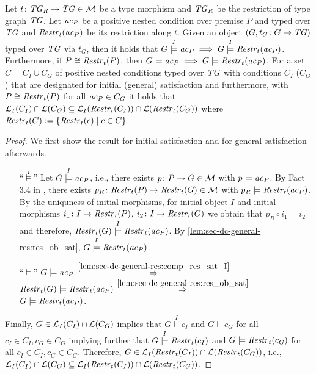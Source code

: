 \begin{proposition}
\label{lem:sec-dc-general-res:comp_res_sat_II}
Let $t\colon \mathit{TG}_R \to \mathit{TG} \in {\cal M}$ be a type morphism and $\mathit{TG}_R$ be the restriction of type graph $\mathit{TG}$.
Let $\mathit{ac}_P$ be a positive nested condition over premise $P$ and typed over $\mathit{TG}$ and $\mathit{Restr}_t(\mathit{ac}_P)$ be its restriction along $t$.
Given an object $(G,t_G\colon G \to \mathit{TG})$ typed over $\mathit{TG}$ via $t_G$, then it holds that $G \stackrel{I}{\models} \mathit{ac}_P \implies G \stackrel{I}{\models} \mathit{Restr}_t(\mathit{ac}_P)$.
Furthermore, if $P \cong \mathit{Restr}_t(P)$, then $G \models \mathit{ac}_P \implies G \models \mathit{Restr}_t(\mathit{ac}_P)$.
For a set $C=C_I \cup C_G$ of positive nested conditions typed over $\mathit{TG}$ with conditions $C_I$ ($C_G$) that are designated for initial (general) satisfaction and furthermore, with $P \cong \mathit{Restr}_t(P)$ for all $\mathit{ac}_P \in C_G$ it holds that $\mathcal{L}_I(C_I) \cap \mathcal{L}(C_G) \subseteq \mathcal{L}_I(\mathit{Restr}_t(C_I)) \cap \mathcal{L}(\mathit{Restr}_t(C_G))$ where $\mathit{Restr}_t(C):=\{\mathit{Restr}_t(c) \mid c \in C\}$.
\envEndMarker
\end{proposition}

\begin{proof}
We first show the result for initial satisfaction and for general satisfaction afterwards.
\begin{enumerate}
  \item[``$\stackrel{I}{\models}$''] Let $G \stackrel{I}{\models} \mathit{ac}_P$, i.e., there exists $p\colon P \to G \in {\cal M}$ with $p \models \mathit{ac}_P$.
  By Fact 3.4 in \cite{DBLP:journals/corr/abs-1209-1436}, there exists $p_R\colon \mathit{Restr}_t(P) \to \mathit{Restr}_t(G) \in {\cal M}$ with $p_R \models \mathit{Restr}_t(\mathit{ac}_P)$.
  By the uniquness of initial morphisms, for initial object $I$ and initial morphisms $i_1\colon I \to \mathit{Restr}_t(P)$, $i_2\colon I \to \mathit{Restr}_t(G)$ we obtain that $p_R \circ i_1=i_2$ and therefore, $\mathit{Restr}_t(G) \stackrel{I}{\models} \mathit{Restr}_t(\mathit{ac}_P)$.
  By \cref{lem:sec-dc-general-res:res_ob_sat}, $G \stackrel{I}{\models} \mathit{Restr}_t(\mathit{ac}_P)$.
  \item[``$\models$''] $G \models \mathit{ac}_P$ $\stackrel{\cref{lem:sec-dc-general-res:comp_res_sat_I}}{\Rightarrow}$ $\mathit{Restr}_t(G) \models \mathit{Restr}_t(\mathit{ac}_P)$ $\stackrel{\cref{lem:sec-dc-general-res:res_ob_sat}}{\Rightarrow}$ $G \models \mathit{Restr}_t(\mathit{ac}_P)$.
\end{enumerate}
Finally, $G \in \mathcal{L}_I(C_I) \cap \mathcal{L}(C_G)$ implies that $G \stackrel{I}{\models} c_I$ and $G \models c_G$ for all $c_I \in C_I,c_G \in C_G$ implying further that $G \stackrel{I}{\models} \mathit{Restr}_t(c_I)$ and $G \models \mathit{Restr}_t(c_G)$ for all $c_I \in C_I,c_G \in C_G$.
Therefore, $G \in \mathcal{L}_I(\mathit{Restr}_t(C_I)) \cap \mathcal{L}(\mathit{Restr}_t(C_G))$, i.e., $\mathcal{L}_I(C_I) \cap \mathcal{L}(C_G) \subseteq \mathcal{L}_I(\mathit{Restr}_t(C_I)) \cap \mathcal{L}(\mathit{Restr}_t(C_G))$.
\end{proof}

